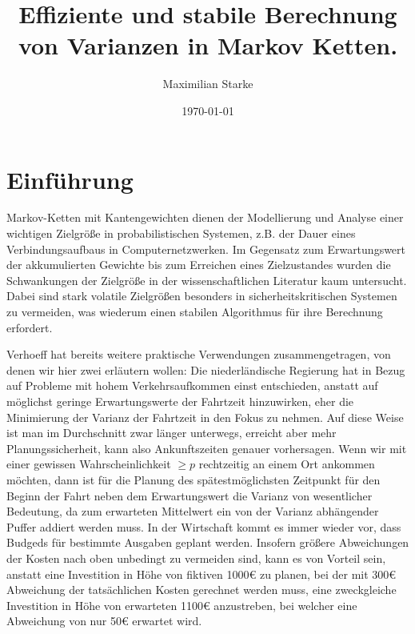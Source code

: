 \documentclass[a4paper]{article}
\title{Effiziente und stabile Berechnung von Varianzen in Markov Ketten.}
\author{Maximilian Starke}
\affil{Fakultät für Informatik, Technische Universität Dresden}
\date{\today}
\theoremstyle{nonumberplain}
\begin{document}
\maketitle

\vspace{2cm}

\tableofcontents

\pagebreak

\newenvironment{meta}
{\begin{center} \Large \color{red} META: \hspace{2ex} \large \color{blue}}
{\end{center}}

\section{Einführung}

Markov-Ketten mit Kantengewichten dienen der Modellierung und Analyse einer wichtigen Zielgröße in probabilistischen Systemen, z.B. der Dauer eines Verbindungsaufbaus in Computernetzwerken.
Im Gegensatz zum Erwartungswert der akkumulierten Gewichte bis zum Erreichen eines Zielzustandes wurden die Schwankungen der Zielgröße in der wissenschaftlichen Literatur kaum untersucht.
Dabei sind stark volatile Zielgrößen besonders in sicherheitskritischen Systemen zu vermeiden, was wiederum einen stabilen Algorithmus für ihre Berechnung erfordert.


Verhoeff \cite{Verh04} hat bereits weitere praktische Verwendungen zusammengetragen, von denen wir hier zwei erläutern wollen:
Die niederländische Regierung hat in Bezug auf Probleme mit hohem Verkehrsaufkommen einst entschieden, anstatt auf möglichst geringe Erwartungswerte der Fahrtzeit hinzuwirken, eher die Minimierung der Varianz der Fahrtzeit in den Fokus zu nehmen. Auf diese Weise ist man im Durchschnitt zwar länger unterwegs, erreicht aber mehr Planungssicherheit, kann also Ankunftszeiten genauer vorhersagen.
Wenn wir mit einer gewissen Wahrscheinlichkeit $\geq p$ rechtzeitig an einem Ort ankommen möchten, dann ist für die Planung des spätestmöglichsten Zeitpunkt für den Beginn der Fahrt neben dem Erwartungswert die Varianz von wesentlicher Bedeutung, da zum erwarteten Mittelwert ein von der Varianz abhängender Puffer addiert werden muss.
In der Wirtschaft kommt es immer wieder vor, dass Budgeds für bestimmte Ausgaben geplant werden. Insofern größere Abweichungen der Kosten nach oben unbedingt zu vermeiden sind, kann es von Vorteil sein, anstatt eine Investition in Höhe von fiktiven 1000\euro{} zu planen, bei der mit 300\euro{} Abweichung der tatsächlichen Kosten gerechnet werden muss, eine zweckgleiche Investition in Höhe von erwarteten 1100\euro{} anzustreben, bei welcher eine Abweichung von nur 50\euro{} erwartet wird.
\end{document}
